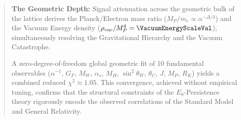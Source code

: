 \begin{abstract}
\textbf{The Geometric Depth:} Signal attenuation across the geometric bulk of the lattice derives the Planck/Electron mass ratio ($M_P/m_e \propto \alpha^{-\Delta/4}$) and the Vacuum Energy density ($\rho_{vac}/M_P^4 = \VacuumEnergyScaleVal$), simultaneously resolving the Gravitational Hierarchy and the Vacuum Catastrophe.

A zero-degree-of-freedom global geometric fit of 10 fundamental observables ($\alpha^{-1}$, $G_F$, $M_W$, $\alpha_s$, $M_H$, $\sin^2\theta_W$, $\theta_C$, $J$, $M_P$, $R_K$) yields a combined reduced $\chi^2 \approx 1.05$. This convergence, achieved without empirical tuning, confirms that the structural constraints of the $E_8$-Persistence theory rigorously encode the observed correlations of the Standard Model and General Relativity.
\end{abstract}